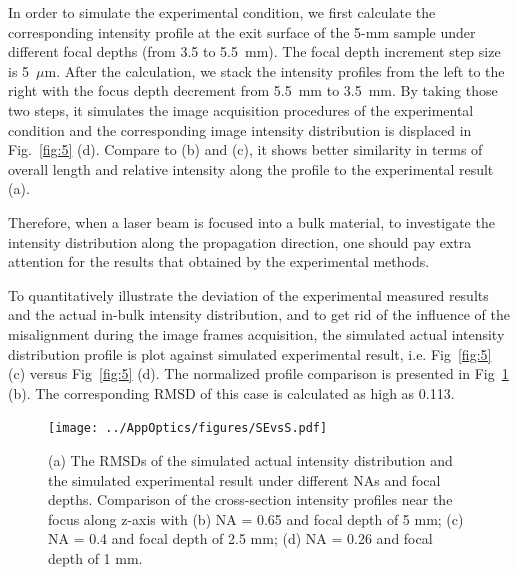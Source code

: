 \documentclass[9pt,twocolumn,twoside]{osajnl}
\begin{document}
In order to simulate the experimental condition, we first calculate the corresponding intensity profile at the exit surface of the 5-mm sample under different focal depths (from 3.5 to 5.5~mm). The focal depth increment step size is 5~$\mu$m. After the calculation, we stack the intensity profiles from the left to the right with the focus depth decrement from 5.5~mm to 3.5~mm. By taking those two steps, it simulates the image acquisition procedures of the experimental condition and the corresponding image intensity distribution is displaced in Fig.~\ref{fig:5} (d). Compare to (b) and (c), it shows better similarity in terms of overall length and relative intensity along the profile to the experimental result (a).

Therefore, when a laser beam is focused into a bulk material, to investigate the intensity distribution along the propagation direction, one should pay extra attention for the results that obtained by the experimental methods. 

To quantitatively illustrate the deviation of the experimental measured results and the actual in-bulk intensity distribution, and to get rid of the influence of the misalignment during the image frames acquisition, the simulated actual intensity distribution profile is plot against simulated experimental result, i.e. Fig~\ref{fig:5} (c) versus Fig~\ref{fig:5} (d). The normalized profile comparison is presented in Fig~\ref{fig:6} (b). The corresponding RMSD of this case is calculated as high as 0.113.

\begin{figure}[ht]
	\centering
	\texttt{[image: ../AppOptics/figures/SEvsS.pdf]}
	\caption{(a) The RMSDs of the simulated actual intensity distribution and the simulated experimental result under different NAs and focal depths. Comparison of the cross-section intensity profiles near the focus along z-axis with (b) NA = 0.65 and focal depth of 5 mm; (c) NA = 0.4 and focal depth of 2.5 mm; (d) NA = 0.26 and focal depth of 1 mm.}\label{fig:6}
\end{figure}
\end{document}
